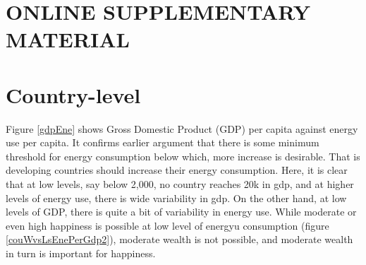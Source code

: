 \documentclass[10pt, letterpaper]{article}
\begin{document}
\begin{spacing}{1.5}









\newpage
\section*{\huge ONLINE SUPPLEMENTARY MATERIAL}

\tableofcontents
\setcounter{figure}{0}    
\setcounter{table}{0}    

\renewcommand{\thetable}{S\arabic{table}}
\renewcommand{\thefigure}{S\arabic{figure}}

\section{Country-level}



Figure \ref{gdpEne} shows Gross Domestic Product (GDP) per capita against energy use per
capita. It confirms earlier argument that there is some minimum threshold for
energy consumption below which, more increase is desirable. That is developing
countries should increase their energy consumption. Here, it is clear that at
low levels, say below 2,000, no country reaches 20k in gdp, and at higher levels
of energy use, there is wide variability in gdp. On the other hand, at low
levels of GDP, there is quite a bit of variability in energy use. While
moderate or even high happiness is possible at low level of energyu consumption (figure
\ref{couWvsLsEnePerGdp2}), moderate wealth is not possible, and moderate wealth
in turn is important for happiness. 


\end{spacing}
\end{document}
